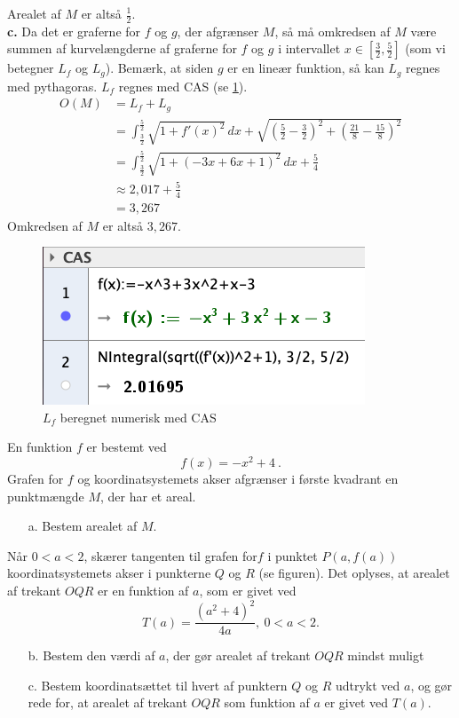 \documentclass{article}
\begin{document}
Arealet af $M$ er altså $\frac{1}{2}$. \\[1ex]
\textbf{c.}
Da det er graferne for $f$ og $g$, der afgrænser $M$, så må omkredsen af $M$ være summen af kurvelængderne af graferne for $f$ og $g$ i intervallet $x \in \left[\frac{3}{2},\frac{5}{2}\right]$ (som vi betegner $L_f$ og $L_g$).
Bemærk, at siden $g$ er en lineær funktion, så kan $L_g$ regnes med pythagoras. 
$L_f$ regnes med CAS (se \cref{fig:L_f}).
\begin{equation*}
\begin{split}
  O(M)&=L_f+L_g\\ 
  &=\int_{\frac{3}{2}}^{\frac{5}{2}} \sqrt{1+f'(x)^2}  \,dx + \sqrt{\left(\frac{5}{2}-\frac{3}{2}\right) ^2+\left(\frac{21}{8}-\frac{15}{8}\right)^2 } \\
  &=\int_{\frac{3}{2}}^{\frac{5}{2}} \sqrt{1+ \left(-3x+6x+1\right)^2}  \,dx +\frac{5}{4}\\ 
  &\approx 2,017 + \frac{5}{4}\\ 
  &=3,267
\end{split}
\end{equation*}
Omkredsen af $M$ er altså $3,267$. 
\begin{figure}[H]
\begin{center}
  \includegraphics[scale=0.7]{L_f.png}
\end{center}
\caption{$L_f$ beregnet numerisk med CAS}
\label{fig:L_f}
\end{figure}
\begin{question}{}{}
  En funktion $f$ er bestemt ved
$$f(x)=-x^2+4\:.$$
Grafen for $f$ og koordinatsystemets akser afgrænser i første kvadrant en punktmængde $M$, der har et areal.
\begin{itemize}
  \item[a.] Bestem arealet af $M.$
\end{itemize}
Når $0<a<2$, skærer tangenten til grafen for$f$ i punktet $P(a,f(a))$ koordinatsystemets akser i punkterne $Q$ og $R$ (se figuren). Det oplyses, at arealet af trekant $OQR$ er en funktion af $a$, som er givet ved
$$T(a)=\dfrac{(a^2+4)^2}{4a},\:0<a<2.$$
\begin{itemize}
  \item[b.] Bestem den værdi af $a$, der gør arealet af trekant $OQR$ mindst muligt
  \item[c.] Bestem koordinatsættet til hvert af punktern $Q$ og $R$ udtrykt ved $a$, og gør rede for, at arealet af trekant $OQR$ som funktion af $a$ er givet ved $T(a).$
\end{itemize}
\end{question}
\end{document}
